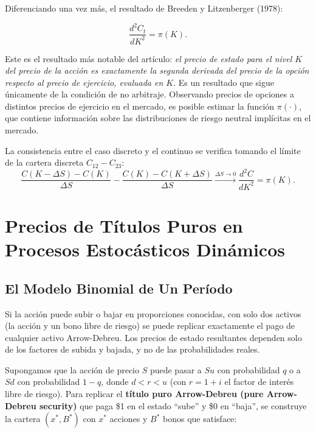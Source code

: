 \documentclass[12pt]{article}
\begin{document}
Diferenciando una vez m\'as, el resultado de Breeden y Litzenberger (1978):

\begin{equation}
  \frac{d^2 C_t}{dK^2} = \pi(K).
  \label{eq:breedenlit}
\end{equation}

\begin{intuicionmat}
Este es el resultado m\'as notable del art\'iculo: \textit{el precio de estado para el nivel $K$ del precio de la acci\'on es exactamente la segunda derivada del precio de la opci\'on respecto al precio de ejercicio, evaluada en $K$}. Es un resultado que sigue \'unicamente de la condici\'on de no arbitraje. Observando precios de opciones a distintos precios de ejercicio en el mercado, es posible estimar la funci\'on $\pi(\cdot)$, que contiene informaci\'on sobre las distribuciones de riesgo neutral impl\'icitas en el mercado.
\end{intuicionmat}

La consistencia entre el caso discreto y el continuo se verifica tomando el l\'imite de la cartera discreta $C_{12} - C_{23}$:
\[
  \frac{C(K-\Delta S) - C(K)}{\Delta S} - \frac{C(K) - C(K+\Delta S)}{\Delta S} \xrightarrow{\Delta S \to 0} \frac{d^2 C}{dK^2} = \pi(K).
\]

\section{Precios de T\'itulos Puros en Procesos Estoc\'asticos Din\'amicos}

\subsection{El Modelo Binomial de Un Per\'iodo}

\begin{intuicion}
Si la acci\'on puede subir o bajar en proporciones conocidas, con solo dos activos (la acci\'on y un bono libre de riesgo) se puede replicar exactamente el pago de cualquier activo Arrow-Debreu. Los precios de estado resultantes dependen solo de los factores de subida y bajada, y no de las probabilidades reales.
\end{intuicion}

Supongamos que la acci\'on de precio $S$ puede pasar a $Su$ con probabilidad $q$ o a $Sd$ con probabilidad $1 - q$, donde $d < r < u$ (con $r = 1 + i$ el factor de inter\'es libre de riesgo). Para replicar el \textbf{t\'itulo puro Arrow-Debreu (pure Arrow-Debreu security)} que paga \$1 en el estado ``sube'' y \$0 en ``baja'', se construye la cartera $(x^*, B^*)$ con $x^*$ acciones y $B^*$ bonos que satisface:
\end{document}
